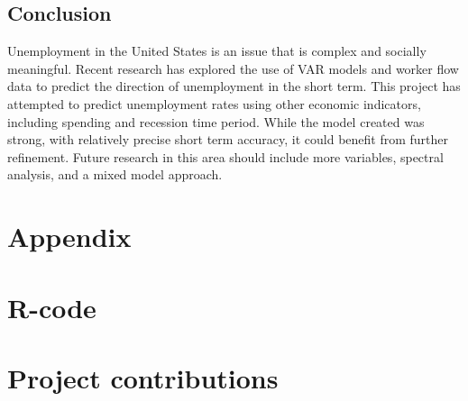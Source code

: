 \documentclass[twoside,twocolumn]{article}
\begin{document}
\subsection{Conclusion}

Unemployment in the United States is an issue that is complex and socially meaningful. Recent research has explored the use of VAR models and worker flow data to predict the direction of unemployment in the short term. This project has attempted to predict unemployment rates using other economic indicators, including spending and recession time period. While the model created was strong, with relatively precise short term accuracy, it could benefit from further refinement. Future research in this area should include more variables, spectral analysis, and a mixed model approach. 


\begin{flushleft}
\end{flushleft}
 \section{Appendix}
 \appendix
 \section{R-code}
 \section{Project contributions}
 
\end{document}
